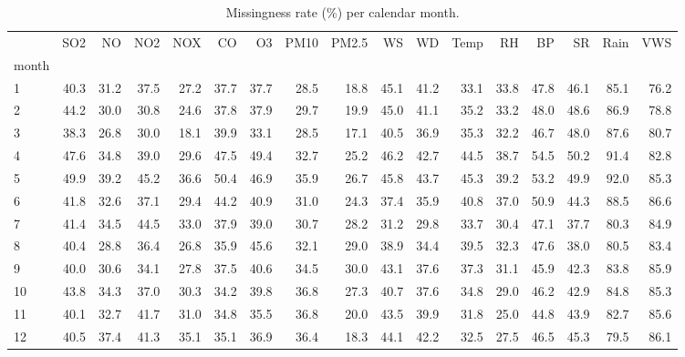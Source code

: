 \begin{table}
\caption{Missingness rate (\%) per calendar month.}
\label{tab:missingness_month}
\begin{tabular}{lrrrrrrrrrrrrrrrr}
\toprule
 & SO2 & NO & NO2 & NOX & CO & O3 & PM10 & PM2.5 & WS & WD & Temp & RH & BP & SR & Rain & VWS \\
month &  &  &  &  &  &  &  &  &  &  &  &  &  &  &  &  \\
\midrule
1 & 40.3 & 31.2 & 37.5 & 27.2 & 37.7 & 37.7 & 28.5 & 18.8 & 45.1 & 41.2 & 33.1 & 33.8 & 47.8 & 46.1 & 85.1 & 76.2 \\
2 & 44.2 & 30.0 & 30.8 & 24.6 & 37.8 & 37.9 & 29.7 & 19.9 & 45.0 & 41.1 & 35.2 & 33.2 & 48.0 & 48.6 & 86.9 & 78.8 \\
3 & 38.3 & 26.8 & 30.0 & 18.1 & 39.9 & 33.1 & 28.5 & 17.1 & 40.5 & 36.9 & 35.3 & 32.2 & 46.7 & 48.0 & 87.6 & 80.7 \\
4 & 47.6 & 34.8 & 39.0 & 29.6 & 47.5 & 49.4 & 32.7 & 25.2 & 46.2 & 42.7 & 44.5 & 38.7 & 54.5 & 50.2 & 91.4 & 82.8 \\
5 & 49.9 & 39.2 & 45.2 & 36.6 & 50.4 & 46.9 & 35.9 & 26.7 & 45.8 & 43.7 & 45.3 & 39.2 & 53.2 & 49.9 & 92.0 & 85.3 \\
6 & 41.8 & 32.6 & 37.1 & 29.4 & 44.2 & 40.9 & 31.0 & 24.3 & 37.4 & 35.9 & 40.8 & 37.0 & 50.9 & 44.3 & 88.5 & 86.6 \\
7 & 41.4 & 34.5 & 44.5 & 33.0 & 37.9 & 39.0 & 30.7 & 28.2 & 31.2 & 29.8 & 33.7 & 30.4 & 47.1 & 37.7 & 80.3 & 84.9 \\
8 & 40.4 & 28.8 & 36.4 & 26.8 & 35.9 & 45.6 & 32.1 & 29.0 & 38.9 & 34.4 & 39.5 & 32.3 & 47.6 & 38.0 & 80.5 & 83.4 \\
9 & 40.0 & 30.6 & 34.1 & 27.8 & 37.5 & 40.6 & 34.5 & 30.0 & 43.1 & 37.6 & 37.3 & 31.1 & 45.9 & 42.3 & 83.8 & 85.9 \\
10 & 43.8 & 34.3 & 37.0 & 30.3 & 34.2 & 39.8 & 36.8 & 27.3 & 40.7 & 37.6 & 34.8 & 29.0 & 46.2 & 42.9 & 84.8 & 85.3 \\
11 & 40.1 & 32.7 & 41.7 & 31.0 & 34.8 & 35.5 & 36.8 & 20.0 & 43.5 & 39.9 & 31.8 & 25.0 & 44.8 & 43.9 & 82.7 & 85.6 \\
12 & 40.5 & 37.4 & 41.3 & 35.1 & 35.1 & 36.9 & 36.4 & 18.3 & 44.1 & 42.2 & 32.5 & 27.5 & 46.5 & 45.3 & 79.5 & 86.1 \\
\bottomrule
\end{tabular}
\end{table}
